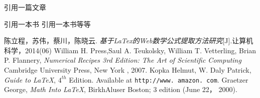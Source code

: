 \documentclass{article}
\begin{document}
	引用一篇文章\textsuperscript{\cite{articlel}}
	
	引用一本书\cite{book1} 引用一本书\cite{latexGuide}等等
	
	\begin{thebibliography}{99}
		陈立程，苏伟，蔡川，陈晓云. \emph{基于LaTex的Web数学公式提取方法研究}[J].让算机科学，2014(06)
		William H. Press,Saul A. Teukolsky,
		William T. Vetterling, Brian P. Flannery,
		\emph{Numerical Recipes 3rd Edition:
			The Art of Scientific Computing}
		Cambridge University Press, New York , 2007.
		 Kopka Helmut, W. Daly Patrick,
		\emph{Guide to \LaTeX}, $4^{th}$ Edition.
		Available at \texttt{http://www. amazon. com}.
		 Graetzer George, \emph{Math Into \LaTeX},
		BirkhAluser Boston; 3 edition (June 22， 2000).
	\end{thebibliography}
\end{document}
